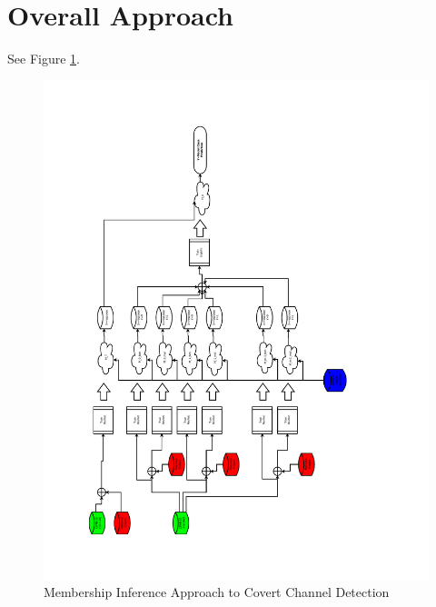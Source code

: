 \section{Overall Approach} \label{app-approach}

See Figure \ref{fig:concept}.

\begin{figure}[ht]
    \centering
    \includegraphics[scale=0.6, angle=-90, trim={2cm 2cm 4cm 2cm}, clip]{graphics/Concept_r1.pdf} %
    \caption{Membership Inference Approach to Covert Channel Detection}
    \label{fig:concept}
\end{figure}




